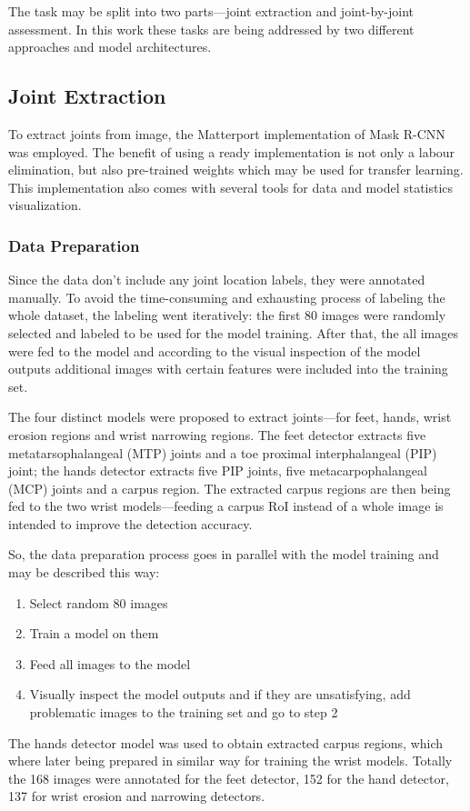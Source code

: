 \documentclass[thesis=B,english]{FITthesis}[2019/12/23]
\begin{document}
The task may be split into two parts---joint extraction and joint-by-joint assessment. In this work these tasks are being addressed by two different approaches and model architectures.

\subsection{Joint Extraction}

To extract joints from image, the Matterport implementation\cite{matterport_maskrcnn_2017} of Mask R-CNN was employed. The benefit of using a ready implementation is not only a labour elimination, but also pre-trained weights which may be used for transfer learning. This implementation also comes with several tools for data and model statistics visualization.

\subsubsection{Data Preparation}

Since the data don't include any joint location labels, they were annotated manually. To avoid the time-consuming and exhausting process of labeling the whole dataset, the labeling went iteratively: the first 80 images were randomly selected and labeled to be used for the model training. After that, the all images were fed to the model and according to the visual inspection of the model outputs additional images with certain features were included into the training set.

The four distinct models were proposed to extract joints---for feet, hands, wrist erosion regions and wrist narrowing regions. The feet detector extracts five metatarsophalangeal (MTP) joints and a toe proximal interphalangeal (PIP) joint; the hands detector extracts five PIP joints, five metacarpophalangeal (MCP) joints and a carpus region. The extracted carpus regions are then being fed to the two wrist models---feeding a carpus RoI instead of a whole image is intended to improve the detection accuracy.

So, the data preparation process goes in parallel with the model training and may be described this way:
\begin{enumerate}
	\item Select random 80 images
	\item Train a model on them
	\item Feed all images to the model
	\item Visually inspect the model outputs and if they are unsatisfying, add problematic images to the training set and go to step 2
\end{enumerate}
The hands detector model was used to obtain extracted carpus regions, which where later being prepared in similar way for training the wrist models. Totally the 168 images were annotated for the feet detector, 152 for the hand detector, 137 for wrist erosion and narrowing detectors.
\end{document}

